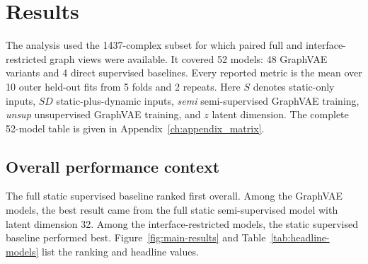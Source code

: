 \chapter{Results}
\label{ch:results}

The analysis used the 1437-complex subset for which paired full and interface-restricted graph views were available. It covered 52 models: 48 GraphVAE variants and 4 direct supervised baselines. Every reported metric is the mean over 10 outer held-out fits from 5 folds and 2 repeats. Here $S$ denotes static-only inputs, $SD$ static-plus-dynamic inputs, \emph{semi} semi-supervised GraphVAE training, \emph{unsup} unsupervised GraphVAE training, and $z$ latent dimension. The complete 52-model table is given in Appendix~\ref{ch:appendix_matrix}.

\section{Overall performance context}

The full static supervised baseline ranked first overall. Among the GraphVAE models, the best result came from the full static semi-supervised model with latent dimension 32. Among the interface-restricted models, the static supervised baseline performed best. Figure~\ref{fig:main-results} and Table~\ref{tab:headline-models} list the ranking and headline values.

\begin{table}[t]
\centering
\small
{}
\caption{Best-performing models in the 52-model comparison. Reported RMSE, Pearson $r$, and $R^2$ values are mean $\pm$ standard deviation over the 10 outer fits. GraphVAE metrics are those obtained after ridge regression on latent means.}
\label{tab:headline-models}
\end{table}

